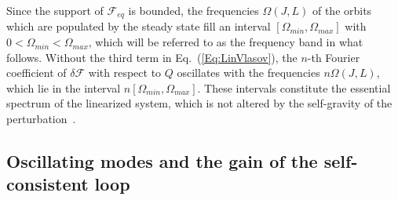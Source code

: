 Since the support of $\mathcal{F}_{eq}$ is bounded, the frequencies $\Omega(J,L)$ of the orbits which are populated by the steady state fill an interval $[\Omega_{min},\Omega_{max}]$ with $0 < \Omega_{min} < \Omega_{max}$, which will be referred to as the frequency band in what follows. Without the third term in Eq.~(\ref{Eq:LinVlasov}), the $n$-th Fourier coefficient of $\delta\mathcal{F}$ with respect to $Q$ oscillates with the frequencies $n\Omega(J,L)$, which lie in the interval $n[\Omega_{min},\Omega_{max}]$. These intervals constitute the essential spectrum of the linearized system, which is not altered by the self-gravity of the perturbation~\cite{mHgRcS22,mHgRmScS25}.


\subsection{Oscillating modes and the gain of the self-consistent loop}
\label{SubSec:Gain}

